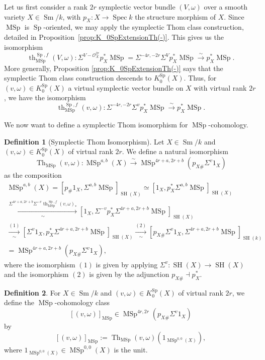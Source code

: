 \documentclass[10pt]{amsart}
\theoremstyle{definition}
\newtheorem{defn}{Definition}[section]
\theoremstyle{plain}
\numberwithin{equation}{section}
\newcommand{\0}{\emptyset}
\newcommand{\sO}{{\mathcal O}}
\newcommand{\MSp}{{\operatorname{MSp}}}
\newcommand{\Sp}{{\operatorname{Sp}}}
\newcommand{\Spec}{{\operatorname{Spec}}}
\newcommand{\SH}{{\operatorname{SH}}}
\newcommand{\Th}{{\operatorname{Th}}}
\newcommand{\Sm}{{\operatorname{Sm}}}
\renewcommand{\th}{{\operatorname{th}}}
\begin{document}
Let us first consider a rank $2r$ symplectic vector bundle $(V,\omega)$ over a smooth variety $X\in \Sm/k$, with $p_X:X \to \Spec k$ the structure morphism of $X$. Since $\MSp$ is $\Sp$-oriented, we may apply the symplectic Thom class construction, detailed in Proposition~\ref{prop:K_0SpExtensionTh(-)}. This gives us the isomorphism
\[
\th^{\Sp,f}_{\MSp}(V,\omega):\Sigma^{V-\sO_X^{2r}}p_X^*\MSp=\Sigma^{-4r,-2r}\Sigma^Vp_X^*\MSp\xrightarrow{\sim} p_X^*\MSp.
\]
More generally, Proposition \ref{prop:K_0SpExtensionTh(-)} says that the symplectic Thom class construction descends to $K^\Sp_0(X)$. Thus, for $(v,\omega)\in K^\Sp_0(X)$ a virtual symplectic vector bundle on $X$ with virtual rank $2r$, we have the isomorphism
\[
\th^{\Sp,f}_{\MSp}(v,\omega): \Sigma^{-4r,-2r}\Sigma^vp_X^*\MSp\xrightarrow{\sim} p_X^*\MSp.
\]

We now want to define a symplectic Thom isomorphism for $\MSp$-cohomology.

\begin{defn}[Symplectic Thom Isomorphism] \label{def:symplThomisos} Let $X\in \Sm/k$ and $(v,\omega)\in K_0^\Sp(X)$ of virtual rank $2r$. We   define a natural isomorphism
\[
\Th_\MSp(v,\omega):\MSp^{a,b}(X)\xrightarrow{\sim} \MSp^{4r+a, 2r+b}(p_{X\#}\Sigma^v1_X)
\]
as the composition
\begin{multline*}
\MSp^{a,b}(X)=[p_\#1_X,\Sigma^{a,b}\MSp]_{\SH(X)}\simeq [1_X, p_X^*\Sigma^{a,b}\MSp]_{\SH(X)}\\ \xrightarrow[\sim]{\Sigma^{4r+a, 2r+b}\Sigma^{-v}\th^{\Sp,f}_{\MSp}(v,\omega)_*}
[1_X, \Sigma^{-v}p_X^*\Sigma^{4r+a,2r+b}\MSp]_{\SH(X)}\\
\xrightarrow[\sim]{(1)} [\Sigma^v1_X, p_X^*\Sigma^{4r+a,2r+b}\MSp]_{\SH(X)}\xrightarrow[\sim]{(2)}
[p_{X\#}\Sigma^v1_X, \Sigma^{4r+a,2r+b}\MSp]_{\SH(k)}\\=\MSp^{4r+a,2r+b}(p_{X\#}\Sigma^v1_X),
\end{multline*}
where the isomorphism $(1)$ is given by applying $\Sigma^v:\SH(X)\to \SH(X)$ and the isomorphism $(2)$ is given by the adjunction $p_{X\#}\dashv p_X^*$.
\end{defn}

\begin{defn}\label{def:generalsymplthomclasses} For $X\in \Sm/k$ and $(v,\omega)\in K_0^\Sp(X)$ of virtual rank $2r$, we define the $\MSp$-cohomology class
\[
[(v,\omega)]_\MSp\in \MSp^{4r, 2r}(p_{X\#}\Sigma^v1_X)
\]
by
\[
[(v,\omega)]_\MSp:=\Th_\MSp(v,\omega)(1_{\MSp^{0,0}(X)}),
\]
where $1_{\MSp^{0,0}(X)}\in \MSp^{0,0}(X)$ is the unit.
\end{defn}
\end{document}
